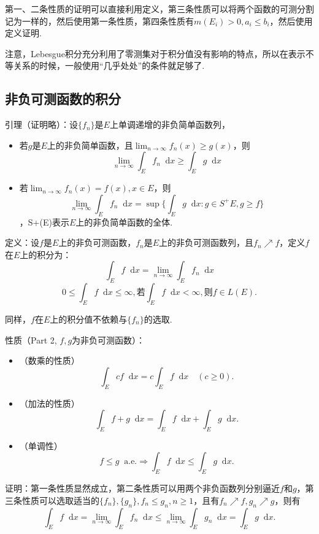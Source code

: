 \documentclass[bwprint, withoutpreface]{cumcmthesis}
\newcommand*{\dif}{\mathop{}\!\mathrm{d}}
\begin{document}
第一、二条性质的证明可以直接利用定义，第三条性质可以将两个函数的可测分割记为一样的，然后使用第一条性质，第四条性质有$m(E_i) > 0, a_i \leqslant b_i$，然后使用定义证明.

注意，Lebesgue积分充分利用了零测集对于积分值没有影响的特点，所以在表示不等关系的时候，一般使用“几乎处处”的条件就足够了.

\subsection{非负可测函数的积分}
\indent 引理（证明略）：设$\{f_n\}$是$E$上单调递增的非负简单函数列，
\begin{itemize}[itemindent=2em]
	\item 若$g$是$E$上的非负简单函数，且$\lim_{n \to \infty} f_n(x) \geqslant g(x)$，则\[ \lim_{n \to \infty}{\int_E f_n \dif x \geqslant \int_E g \dif x} \]
	\item 若$\lim_{n \to \infty}{f_n(x) = f(x), x \in E}$，则 \[ \lim_{n \to \infty}{\int_E f_n \dif x} = \sup{\{ \int_E g \dif x: g \in S^+{E}, g \geqslant f \}} \]，S+(E)表示$E$上的非负简单函数的全体.
\end{itemize}

定义：设$f$是$E$上的非负可测函数，$f_n$是$E$上的非负可测函数列，且$f_n \nearrow f$，定义$f$在$E$上的积分为：
\begin{equation*}
	\int_E f \dif x = \lim_{n \to \infty} \int_E f_n \dif x 
\end{equation*}
\begin{equation*}
	0 \leqslant \int_E{f} \dif x \leqslant \infty, \mbox{若} \int_E{f} \dif x < \infty, \mbox{则}f \in L(E).
\end{equation*}

同样，$f$在$E$上的积分值不依赖与$\{f_n\}$的选取.

性质（Part 2, $f, g$为非负可测函数）：
\begin{itemize}[itemindent=2em]
	\item（数乘的性质） \[ \int_E cf \dif x = c \int_E f \dif x \quad (c \geqslant 0). \]
	\item（加法的性质） \[ \int_E f + g \dif x = \int_E f \dif x + \int_E g \dif x. \]
	\item（单调性）\[ f \leqslant g \mathop{} \! \mathrm{a.e.} \Rightarrow \int_E f \dif x \leqslant \int_E g \dif x. \]
\end{itemize}

证明：第一条性质显然成立，第二条性质可以用两个非负函数列分别逼近$f$和$g$，第三条性质可以选取适当的$\{f_n\}, \{g_n\}, f_n \leqslant g_n, n \geqslant 1$，且有$f_n \nearrow f, g_n \nearrow g$，则有 \[ \int_E f \dif x = \lim_{n \to \infty}{\int_E f_n \dif x} \leqslant \lim_{n \to \infty}{\int_E g_n \dif x} = \int_E g \dif x. \]
\end{document}

